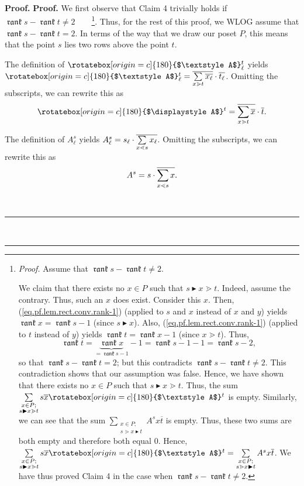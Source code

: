 \documentclass[numbers=enddot,12pt,final,onecolumn,notitlepage]{scrartcl}%
\theoremstyle{definition}
\newenvironment{verlong}{}{}
\newcommand{\upslack}{\mathchoice{\rotatebox[origin=c]{180}{$\displaystyle A$}}{\rotatebox[origin=c]{180}{$\textstyle A$}}{\rotatebox[origin=c]{180}{$\scriptstyle A$}}{\rotatebox[origin=c]{180}{$\scriptscriptstyle A$}}}
\newcommand{\downslack}{A}
\DeclareMathOperator{\rank}{\mathfrak{rank}}
\newenvironment{proof}[1][Proof]{\noindent\textbf{#1.} }{\ \rule{0.5em}{0.5em}}
\let\sumnonlimits\sum
\renewcommand{\sum}{\sumnonlimits\limits}
\begin{document}
\begin{proof}
\begin{proof}
\begin{verlong}
We first observe that Claim 4 trivially holds if $\rank s-\rank t\neq
2$\ \ \ \ \footnote{\textit{Proof.} Assume that $\rank s-\rank t\neq2$.
\par
We claim that there exists no $x\in P$ such that $s\blacktriangleright
x\gtrdot t$. Indeed, assume the contrary. Thus, such an $x$ does exist.
Consider this $x$. Then, (\ref{eq.pf.lem.rect.conv.rank-1}) (applied to $s$
and $x$ instead of $x$ and $y$) yields $\rank x=\rank s-1$ (since
$s\blacktriangleright x$). Also, (\ref{eq.pf.lem.rect.conv.rank-1}) (applied
to $t$ instead of $y$) yields $\rank t=\rank x-1$ (since $x\gtrdot t$). Thus,%
\[
\rank t=\underbrace{\rank x}_{=\rank s-1}-1=\rank s-1-1=\rank s-2,
\]
so that $\rank s-\rank t=2$; but this contradicts $\rank s-\rank t\neq2$. This
contradiction shows that our assumption was false. Hence, we have shown that
there exists no $x\in P$ such that $s\blacktriangleright x\gtrdot t$. Thus,
the sum $\sum_{\substack{x\in P;\\s\blacktriangleright x\gtrdot t}%
}s\overline{x}\upslack^{t}$ is empty. Similarly, we can see that the sum
$\sum_{\substack{x\in P;\\s\gtrdot x\blacktriangleright t}}\downslack^{s}%
x\overline{t}$ is empty. Thus, these two sums are both empty and therefore
both equal $0$. Hence, $\sum_{\substack{x\in P;\\s\blacktriangleright x\gtrdot
t}}s\overline{x}\upslack^{t}=\sum_{\substack{x\in P;\\s\gtrdot
x\blacktriangleright t}}\downslack^{s}x\overline{t}$. We have thus proved
Claim 4 in the case when $\rank s-\rank t\neq2$.}. Thus, for the rest of this
proof, we WLOG assume that $\rank s-\rank t=2$. In terms of the way that we
draw our poset $P$, this means that the point $s$ lies two rows above the
point $t$.
\end{verlong}

The definition of $\upslack_{\ell}^{t}$ yields $\upslack_{\ell}^{t}%
=\overline{\sum\limits_{x\gtrdot t}\overline{x_{\ell}}}\cdot\overline{t_{\ell
}}$. Omitting the subscripts, we can rewrite this as%
\begin{equation}
\upslack^{t}=\overline{\sum\limits_{x\gtrdot t}\overline{x}}\cdot\overline{t}.
\label{pf.lem.rect.conv.c4.pf.1}%
\end{equation}


The definition of $\downslack_{\ell}^{s}$ yields $\downslack_{\ell}%
^{s}=s_{\ell}\cdot\overline{\sum\limits_{x\lessdot s}x_{\ell}}$. Omitting the
subscripts, we can rewrite this as%
\begin{equation}
\downslack^{s}=s\cdot\overline{\sum\limits_{x\lessdot s}x}.
\label{pf.lem.rect.conv.c4.pf.2}%
\end{equation}



\end{proof}
\end{proof}
\end{document}
